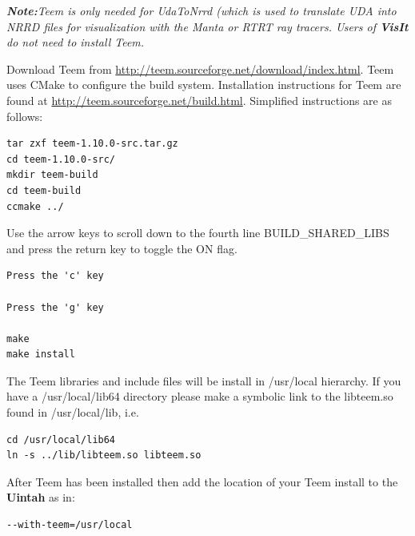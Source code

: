 \documentclass[12pt]{article}
\begin{document}
\label{subsec:teem}

\emph{ \textbf{Note:}Teem is only needed for UdaToNrrd (which is used to
  translate UDA into NRRD files for visualization with the Manta or
  RTRT ray tracers.  Users of \textbf{\emph{VisIt}} do not need to install Teem.}

Download Teem from
\url{http://teem.sourceforge.net/download/index.html}.  Teem uses
CMake to configure the build system. Installation instructions for
Teem are found at \url{http://teem.sourceforge.net/build.html}.
Simplified instructions are as follows:

\begin{verbatim}
tar zxf teem-1.10.0-src.tar.gz
cd teem-1.10.0-src/
mkdir teem-build
cd teem-build
ccmake ../
\end{verbatim}

Use the arrow keys to scroll down to the fourth line
BUILD\_SHARED\_LIBS and press the return key to toggle the ON flag.

\begin{verbatim}
Press the 'c' key

Press the 'g' key

make
make install
\end{verbatim}
The Teem libraries and include files will be install in /usr/local
hierarchy.  If you have a /usr/local/lib64 directory please make a
symbolic link to the libteem.so found in /usr/local/lib, i.e.

\begin{verbatim}
cd /usr/local/lib64
ln -s ../lib/libteem.so libteem.so
\end{verbatim}

After Teem has been installed then add the location of your Teem
install to the \textbf{Uintah} as in:

\begin{verbatim}
--with-teem=/usr/local
\end{verbatim}
\end{document}
